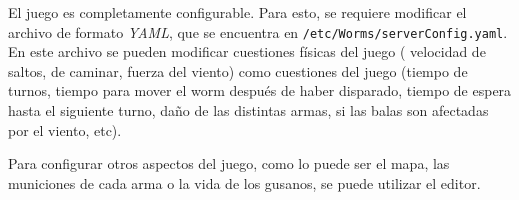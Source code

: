 El juego es completamente configurable. Para esto, se requiere modificar el archivo de formato \emph{YAML}, que se encuentra en \texttt{/etc/Worms/serverConfig.yaml}. En este archivo se pueden modificar cuestiones físicas del juego ( velocidad de saltos, de caminar, fuerza del viento) como cuestiones del juego (tiempo de turnos, tiempo para mover el worm después de haber disparado, tiempo de espera hasta el siguiente turno, daño de las distintas armas, si las balas son afectadas por el viento, etc).

Para configurar otros aspectos del juego, como lo puede ser el mapa, las municiones de cada arma o la vida de los gusanos, se puede utilizar el editor.
